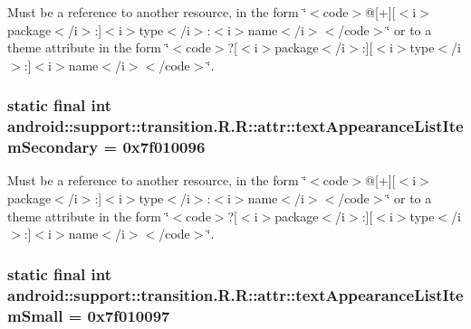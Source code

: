 Must be a reference to another resource, in the form \char`\"{}$<$code$>$@\mbox{[}+\mbox{]}\mbox{[}$<$i$>$package$<$/i$>$:\mbox{]}$<$i$>$type$<$/i$>$:$<$i$>$name$<$/i$>$$<$/code$>$\char`\"{} or to a theme attribute in the form \char`\"{}$<$code$>$?\mbox{[}$<$i$>$package$<$/i$>$:\mbox{]}\mbox{[}$<$i$>$type$<$/i$>$:\mbox{]}$<$i$>$name$<$/i$>$$<$/code$>$\char`\"{}. \hypertarget{classandroid_1_1support_1_1transition_1_1_r_1_1attr_d18b7de79fa356c60ac2a4f85fbc25da}{
\subsubsection[{textAppearanceListItemSecondary}]{\setlength{\rightskip}{0pt plus 5cm}static final int android::support::transition.R.R::attr::textAppearanceListItemSecondary = 0x7f010096}}
\label{classandroid_1_1support_1_1transition_1_1_r_1_1attr_d18b7de79fa356c60ac2a4f85fbc25da}


Must be a reference to another resource, in the form \char`\"{}$<$code$>$@\mbox{[}+\mbox{]}\mbox{[}$<$i$>$package$<$/i$>$:\mbox{]}$<$i$>$type$<$/i$>$:$<$i$>$name$<$/i$>$$<$/code$>$\char`\"{} or to a theme attribute in the form \char`\"{}$<$code$>$?\mbox{[}$<$i$>$package$<$/i$>$:\mbox{]}\mbox{[}$<$i$>$type$<$/i$>$:\mbox{]}$<$i$>$name$<$/i$>$$<$/code$>$\char`\"{}. \hypertarget{classandroid_1_1support_1_1transition_1_1_r_1_1attr_48d4bd4805a673867006d66f293ddfb3}{
\subsubsection[{textAppearanceListItemSmall}]{\setlength{\rightskip}{0pt plus 5cm}static final int android::support::transition.R.R::attr::textAppearanceListItemSmall = 0x7f010097}}
\label{classandroid_1_1support_1_1transition_1_1_r_1_1attr_48d4bd4805a673867006d66f293ddfb3}


